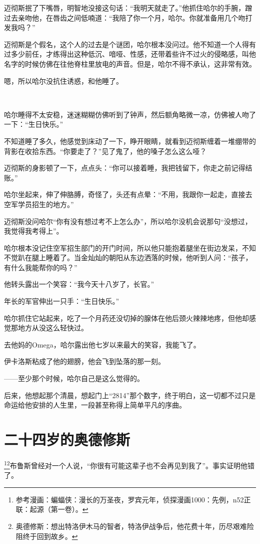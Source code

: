 \documentclass[../main]{subfiles}
\begin{document}
迈彻斯抿了下嘴唇，明智地没接这句话：“我明天就走了。”他抓住哈尔的手腕，蹭过去亲吻他，在唇齿之间低喃道：“我陪了你一个月，哈尔。你就准备用几个吻打发我吗？”

迈彻斯是个假名，这个人的过去是个谜团，哈尔根本没问过。他不知道一个人得有过多少前任，才练得出这种低沉、喑哑、性感，还带着些许不过火的侵略感，叫他名字的时候仿佛在往他脊柱里放电的声音。但是，哈尔不得不承认，这非常有效。

嗯，所以哈尔没抗住诱惑，和他睡了。

~\

哈尔睡得不太安稳，迷迷糊糊仿佛听到了钟声，然后额角略微一凉，仿佛被人吻了一下：“生日快乐。”

不知道睡了多久，他感觉到床动了一下，睁开眼睛，就看到迈彻斯缠着一堆绷带的背影在收拾东西。“你要走了？”见了鬼了，他的嗓子怎么这么哑？

迈彻斯的身影顿了一下，点点头：“你可以接着睡，我把钱留下，你走之前记得结账。”

哈尔坐起来，伸了伸胳膊，奇怪了，头还有点晕：“不用，我跟你一起走，直接去空军学员招生的地方。”

迈彻斯没问哈尔“你有没有想过考不上怎么办”，所以哈尔没机会说那句“没想过，我觉得我考得上”。

哈尔根本没记住空军招生部门的开门时间，所以他只能抱着腿坐在街边发呆，不知不觉趴在腿上睡着了。当金灿灿的朝阳从东边洒落的时候，他听到人问：“孩子，有什么我能帮你的吗？”

他转头露出一个笑容：“我今天十八岁了，长官。”

年长的军官伸出一只手：“生日快乐。”

哈尔抓住它站起来，吃了一个月药还没切掉的腺体在他后颈火辣辣地疼，但他却感觉那地方从没这么轻快过。

去他妈的Omega，哈尔露出他七岁以来最大的笑容，我能飞了。

伊卡洛斯粘成了他的翅膀，他会飞到坠落的那一刻。

——至少那个时候，哈尔自己是这么觉得的。

后来，他想起那个清晨，想起门上“2814”那个数字，终于明白，这一切都不过只是命运给他安排的人生里，一段甚至称得上简单平凡的序曲。

\section{二十四岁的奥德修斯}

\footnote[1]{参考漫画：蝙蝠侠：漫长的万圣夜，罗宾元年，侦探漫画1000：先例，n52正联：起源（第一卷）。}\footnote[2]{奥德修斯：想出特洛伊木马的智者，特洛伊战争后，他花费十年，历尽艰难险阻终于回到故乡。}布鲁斯曾经对一个人说，“你很有可能这辈子也不会再见到我了”。事实证明他错了。
\end{document}
